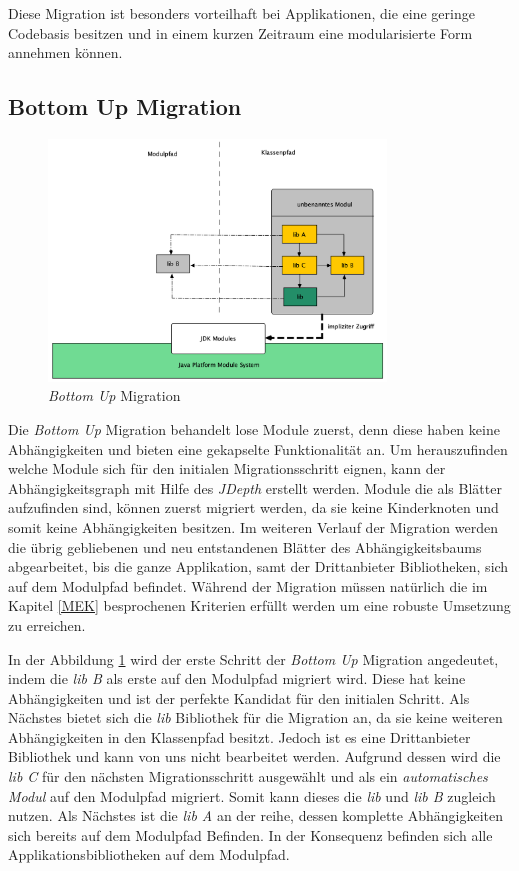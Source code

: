 	Diese Migration ist besonders vorteilhaft bei Applikationen, die eine geringe Codebasis besitzen und in einem kurzen Zeitraum eine modularisierte Form annehmen können. 


\subsection{Bottom Up Migration}

	\begin{figure}[h]
		\centering
	    \includegraphics[width=0.8\textwidth]{material/images/bottom-up-migration.png}
	    \caption{\textit{Bottom Up} Migration}
	    \label{fig:BUM}
  	\end{figure}

	Die \textit{Bottom Up} Migration behandelt lose Module zuerst, denn diese haben keine Abhängigkeiten und bieten eine gekapselte Funktionalität an. Um herauszufinden welche Module sich für den initialen Migrationsschritt eignen, kann der Abhängigkeitsgraph mit Hilfe des \textit{JDepth} erstellt werden. Module die als Blätter aufzufinden sind, können zuerst migriert werden, da sie keine Kinderknoten und somit keine Abhängigkeiten besitzen. Im weiteren Verlauf der Migration werden die übrig gebliebenen und neu entstandenen Blätter des Abhängigkeitsbaums abgearbeitet, bis die ganze Applikation, samt der Drittanbieter Bibliotheken, sich auf dem Modulpfad befindet. Während der Migration müssen natürlich die im Kapitel \ref{MEK} besprochenen Kriterien erfüllt werden um eine robuste Umsetzung zu erreichen.\bigbreak


	In der Abbildung \ref{fig:BUM} wird der erste Schritt der \textit{Bottom Up} Migration angedeutet, indem die \textit{lib B} als erste auf den Modulpfad migriert wird. Diese hat keine Abhängigkeiten und ist der perfekte Kandidat für den initialen Schritt. Als Nächstes bietet sich die \textit{lib} Bibliothek für die Migration an, da sie keine weiteren Abhängigkeiten in den Klassenpfad besitzt. Jedoch ist es eine Drittanbieter Bibliothek und kann von uns nicht bearbeitet werden. Aufgrund dessen wird die \textit{lib C} für  den nächsten Migrationsschritt ausgewählt und als ein \textit{automatisches Modul} auf den Modulpfad migriert. Somit kann dieses die \textit{lib} und \textit{lib B} zugleich nutzen. Als Nächstes ist die \textit{lib A} an der reihe, dessen komplette Abhängigkeiten sich bereits auf dem Modulpfad Befinden. In der Konsequenz befinden sich alle Applikationsbibliotheken auf dem Modulpfad. \bigbreak

